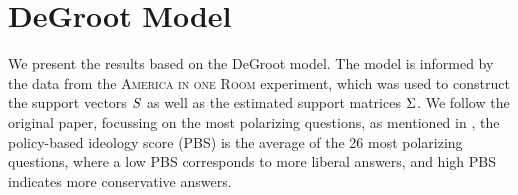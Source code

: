 




\newpage
\section{DeGroot Model}\label{degroot_results}

We present the results based on the DeGroot model. The model is informed by the
data from the \textsc{America in one Room} experiment, which was used to
construct the support vectors $S$ as well as the estimated support
matrices $\Sigma$. We follow the original paper, focussing on the most
polarizing questions,  as mentioned in , the
policy-based ideology score (PBS) is the average of the 26 most polarizing
questions, where a low PBS corresponds to more liberal answers, and high PBS
indicates more conservative answers.

